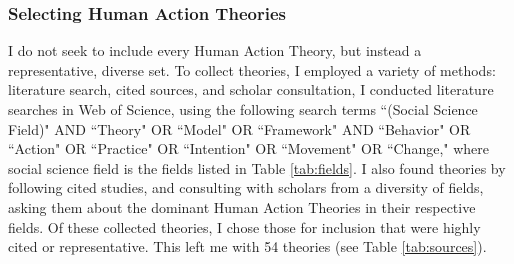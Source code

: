 \documentclass[12 pt]{article}
\begin{document}
	\subsubsection{Selecting Human Action Theories}
	I do not seek to include every Human Action Theory, but instead a representative, diverse set. To collect theories, I employed a variety of methods: literature search,  cited sources,  and scholar consultation,  I conducted literature searches in Web of Science, using the following search terms ``(Social Science Field)" AND ``Theory" OR ``Model" OR ``Framework" AND ``Behavior" OR ``Action" OR ``Practice" OR ``Intention" OR ``Movement" OR ``Change,"  where social science field is the fields listed in Table \ref{tab:fields}.   I also found theories by following cited studies, and consulting with scholars from a diversity of fields, asking them about the dominant Human Action Theories in their respective fields. Of these collected theories, I chose those for inclusion that were highly cited or representative. This left me with 54 theories (see Table \ref{tab:sources}). 
\end{document}

